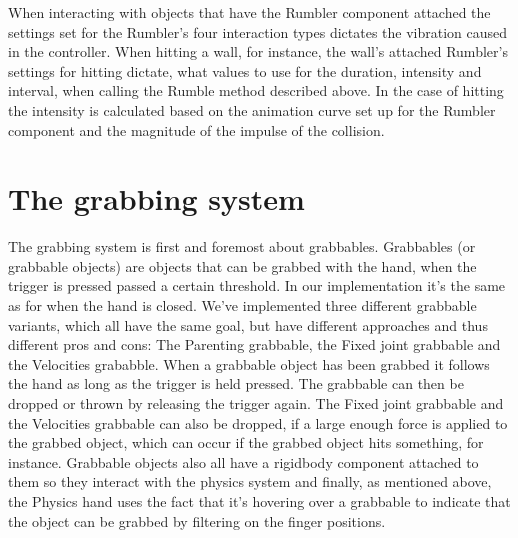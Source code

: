 When interacting with objects that have the Rumbler component attached the settings set for the Rumbler's four interaction types dictates the vibration caused in the controller. When hitting a wall, for instance, the wall's attached Rumbler's settings for hitting dictate, what values to use for the duration, intensity and interval, when calling the Rumble method described above. In the case of hitting the intensity is calculated based on the animation curve set up for the Rumbler component and the magnitude of the impulse of the collision.




\section{The grabbing system}
\label{sec:grabbingSystem}
The grabbing system is first and foremost about grabbables. Grabbables (or grabbable objects) are objects that can be grabbed with the hand, when the trigger is pressed passed a certain threshold. In our implementation it's the same as for when the hand is closed. We've implemented three different grabbable variants, which all have the same goal, but have different approaches and thus different pros and cons: The Parenting grabbable, the Fixed joint grabbable and the Velocities grababble. When a grabbable object has been grabbed it follows the hand as long as the trigger is held pressed. The grabbable can then be dropped or thrown by releasing the trigger again. The Fixed joint grabbable and the Velocities grabbable can also be dropped, if a large enough force is applied to the grabbed object, which can occur if the grabbed object hits something, for instance. Grabbable objects also all have a rigidbody component attached to them so they interact with the physics system and finally, as mentioned above, the Physics hand uses the fact that it's hovering over a grabbable to indicate that the object can be grabbed by filtering on the finger positions.

